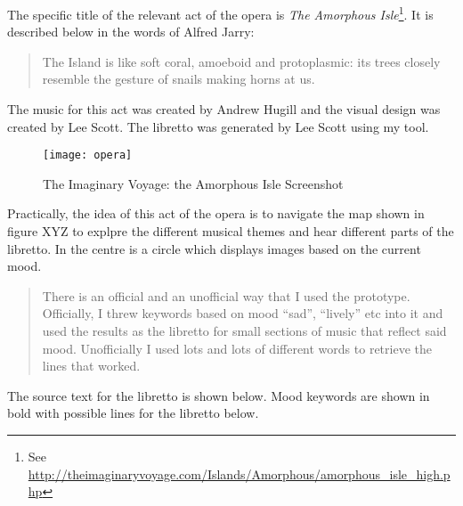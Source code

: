 The specific title of the relevant act of the opera is \emph{The Amorphous Isle}\footnote{See \url{http://theimaginaryvoyage.com/Islands/Amorphous/amorphous_isle_high.php}}. It is described below in the words of Alfred Jarry:

\begin{quotation}
  The Island is like soft coral, amoeboid and protoplasmic: its trees closely resemble the gesture of snails making horns at us.
\end{quotation}

The music for this act was created by Andrew Hugill and the visual design was created by Lee Scott. The libretto was generated by Lee Scott using my tool.

\begin{figure}[h!]
  \centering
  \texttt{[image: opera]}
\caption[Imaginary Voyage: Amorphous Isle]{The Imaginary Voyage: the Amorphous Isle Screenshot}
\label{fig:opera}
\end{figure}

Practically, the idea of this act of the opera is to navigate the map shown in figure XYZ to explpre the different musical themes and hear different parts of the libretto. In the centre is a circle which displays images based on the current mood.

\begin{quotation}
  There is an official and an unofficial way that I used the prototype. Officially, I threw keywords based on mood ``sad'', ``lively'' etc into it and used the results as the libretto for small sections of music that reflect said mood. Unofficially I used lots and lots of different words to retrieve the lines that worked. 
\end{quotation}

\spirals

The source text for the libretto is shown below. Mood keywords are shown in bold with possible lines for the libretto below.


